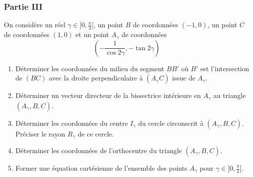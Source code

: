 \subsubsection*{Partie III}
On considère un réel $\gamma \in ]0,\frac{\pi}{4}[$, un point $B$ de coordonnées $(-1,0)$, un point $C$ de coordonnées $(1,0)$ et un point $A_\gamma$ de coordonnées
\[(-\frac{1}{\cos 2\gamma},-\tan 2\gamma)\]
\begin{enumerate}
\item Déterminer les coordonnées du milieu du segment $BB'$ où $B'$ est l'intersection de $(BC)$ avec la droite perpendiculaire à $(A_\gamma C)$ issue de $A_\gamma$.
\item Déterminer un vecteur directeur de la bissectrice intérieure en $A_\gamma$ au triangle $(A_\gamma , B,C)$.
\item Déterminer les coordonnées du centre $I_\gamma$ du cercle circonscrit à $(A_\gamma , B,C)$. Préciser le rayon $R_\gamma$ de ce cercle.
\item Déterminer les coordonnées de l'orthocentre du triangle $(A_\gamma , B,C)$.
\item Former une équation cartésienne de l'ensemble des points $A_\gamma$ pour $\gamma \in ]0,\frac{\pi}{4}[$.
\end{enumerate}

